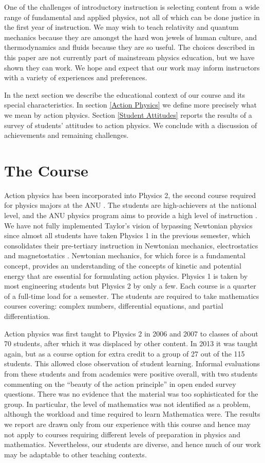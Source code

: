 \documentclass[prb,oncolumn,12pt]{revtex4-2}
\begin{document}
One of the challenges of introductory instruction is selecting content from a wide range of fundamental and applied physics, not all of which can be done justice in the first year of instruction. We may wish to teach relativity and quantum mechanics because they are amongst the hard won jewels of human culture, and thermodynamics and fluids because they are so useful. The choices described in this paper are not currently part of mainstream physics education, but we have shown they can work. We hope and expect that our work may inform instructors with a variety of experiences and preferences.

In the next section we describe the educational context of our course and its special characteristics. In section \ref{Action Physics} we define more precisely what we mean by action physics. Section \ref{Student Attitudes} reports the results of a survey of students' attitudes to action physics. We conclude with a discussion of achievements and remaining challenges. 


\section{The Course}
\label{The Course}

Action physics has been incorporated into Physics 2, the second course
required for physics majors at the ANU \cite{phys1201}.  The students
are high-achievers at the national level, and the ANU physics program
aims to provide a high level of instruction \cite{PECMission}. We have
not fully implemented Taylor's vision of bypassing Newtonian physics
since almost all students have taken Physics 1 in the previous
semester, which consolidates their pre-tertiary instruction in
Newtonian mechanics, electrostatics and magnetostatics
\cite{phys1101}.  Newtonian mechanics, for which force is a
fundamental concept, provides an understanding of the concepts of
kinetic and potential energy that are essential for formulating action
physics. Physics 1 is taken by most engineering students but Physics 2
by only a few. Each course is a quarter of a full-time load for a
semester. The students are required to take mathematics courses
covering: complex numbers, differential equations, and partial
differentiation.

Action physics was first taught to Physics 2 in 2006 and 2007 to
classes of about 70 students, after which it was displaced by other
content. In 2013 it was taught again, but as a course option for extra
credit to a group of 27 out of the 115 students. This allowed close
observation of student learning. Informal evaluations from these
students and from academics were positive overall, with two students
commenting on the ``beauty of the action principle'' in open ended
survey questions. There was no evidence that the material was too
sophisticated for the group. In particular, the level of mathematics
was not identified as a problem, although the workload and time
required to learn Mathematica were. The results we report are drawn
only from our experience with this course and hence may not apply to
courses requiring different levels of preparation in physics and
mathematics. Nevertheless, our students are diverse, and hence much of
our work may be adaptable to other teaching contexts.
\end{document}
